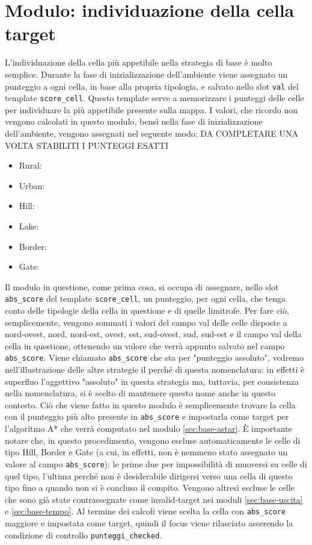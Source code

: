 \section{Modulo: individuazione della cella target} \label{sec:base-target}
L'individuazione della cella più appetibile nella strategia di base è molto semplice. Durante la fase di inizializzazione dell'ambiente viene assegnato un punteggio a ogni cella, in base alla propria tipologia, e salvato nello slot \texttt{val} del template \texttt{score\_cell}. Questo template serve a memorizzare i punteggi delle celle per individuare la più appetibile presente sulla mappa. I valori, che ricordo non vengono calcolati in questo modulo, bensì nella fase di inizializzazione dell'ambiente, vengono assegnati nel seguente modo: {\color{red}DA COMPLETARE UNA VOLTA STABILITI I PUNTEGGI ESATTI}
\begin{itemize}
	\item Rural: 
	\item Urban: 
	\item Hill: 
	\item Lake: 
	\item Border: 
	\item Gate: 	
\end{itemize}
Il modulo in questione, come prima cosa, si occupa di assegnare, nello slot \texttt{abs\_score} del template \texttt{score\_cell}, un punteggio, per ogni cella, che tenga conto delle tipologie della cella in questione e di quelle limitrofe. Per fare ciò, semplicemente, vengono sommati i valori del campo val delle celle disposte a nord-ovest, nord, nord-est, ovest, est, sud-ovest, sud, sud-est e il campo val della cella in questione, ottenendo un valore che verrà appunto salvato nel campo \texttt{abs\_score}. Viene chiamato \texttt{abs\_score} che sta per "punteggio assoluto", vedremo nell'illustrazione delle altre strategie il perché di questa nomenclatura: in effetti è superfluo l'aggettivo "assoluto" in questa strategia ma, tuttavia, per consistenza nella nomenclatura, si è scelto di mantenere questo nome anche in questo contesto.
Ciò che viene fatto in questo modulo è semplicemente trovare la cella con il punteggio più alto presente in \texttt{abs\_score} e impostarla come target per l'algoritmo A* che verrà computato nel modulo \ref{sec:base-astar}. È importante notare che, in questo procedimento, vengono escluse automaticamente le celle di tipo Hill, Border e Gate (a cui, in effetti, non è nemmeno stato assegnato un valore al campo \texttt{abs\_score}): le prime due per impossibilità di muoversi su celle di quel tipo, l'ultima perché non è desiderabile dirigersi verso una cella di questo tipo fino a quando non si è concluso il compito.
Vengono altresì escluse le celle che sono già state contrassegnate come invalid-target nei moduli \ref{sec:base-uscita} e \ref{sec:base-tempo}.
Al termine dei calcoli viene scelta la cella con \texttt{abs\_score} maggiore e impostata come target, quindi il focus viene rilasciato asserendo la condizione di controllo \texttt{punteggi\_checked}.

